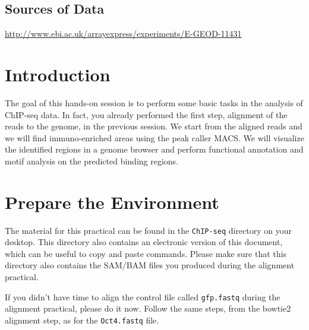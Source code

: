 \subsection{Sources of Data}
  \url{http://www.ebi.ac.uk/arrayexpress/experiments/E-GEOD-11431}


\newpage

\section{Introduction}

\begin{information}
The goal of this hands-on session is to perform some basic tasks in the analysis
of ChIP-seq data. In fact, you already performed the first step, alignment of
the reads to the genome, in the previous session. We start from the aligned
reads and we will find immuno-enriched areas using the peak caller MACS. We will
visualize the identified regions in a genome browser and perform functional
annotation and motif analysis on the predicted binding regions.
\end{information}

\section{Prepare the Environment}

\begin{information}
The material for this practical can be found in the \texttt{ChIP-seq} directory on your
desktop. This directory also contains an electronic version of this document,
which can be useful to copy and paste commands. Please make sure that this
directory also contains the SAM/BAM files you produced during the alignment
practical.
\end{information}

\begin{steps}
If you didn't have time to align the control file called \texttt{gfp.fastq}
during the alignment practical, please do it now. Follow the same steps, from
the bowtie2 alignment step, as for the \texttt{Oct4.fastq} file.
\end{steps}


